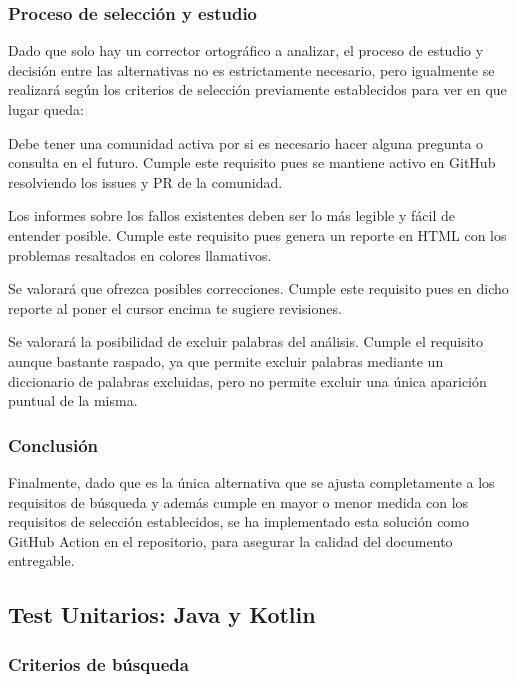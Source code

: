 \subsubsection{Proceso de selección y estudio}
Dado que solo hay un corrector ortográfico a analizar, el proceso de estudio y
decisión entre las alternativas no es estrictamente necesario, pero igualmente
se realizará según los criterios de selección previamente establecidos para ver
en que lugar queda: 

\begin{todolist}
    \item[\xcmark] Debe tener una comunidad activa por si es necesario hacer
    alguna pregunta o consulta en el futuro. Cumple este requisito pues se
    mantiene activo en GitHub resolviendo los issues y PR de la comunidad.
    \item[\xcmark] Los informes sobre los fallos existentes deben ser lo más
    legible y fácil de entender posible. Cumple este requisito pues genera un
    reporte en HTML con los problemas resaltados en colores llamativos.
    \item[\xcmark] Se valorará que ofrezca posibles correcciones. Cumple este
    requisito pues en dicho reporte al poner el cursor encima te sugiere
    revisiones.
    \item[\xcmark] Se valorará la posibilidad de excluir palabras del análisis.
    Cumple el requisito aunque bastante raspado, ya que permite excluir palabras
    mediante un diccionario de palabras excluidas, pero no permite excluir una
    única aparición puntual de la misma.
\end{todolist}

\subsubsection{Conclusión}
Finalmente, dado que es la única alternativa que se ajusta completamente a los
requisitos de búsqueda y además cumple en mayor o menor medida con los
requisitos de selección establecidos, se ha implementado esta solución como
GitHub Action en el repositorio, para asegurar la calidad del documento
entregable.

\subsection{Test Unitarios: Java y Kotlin}

\subsubsection{Criterios de búsqueda}


